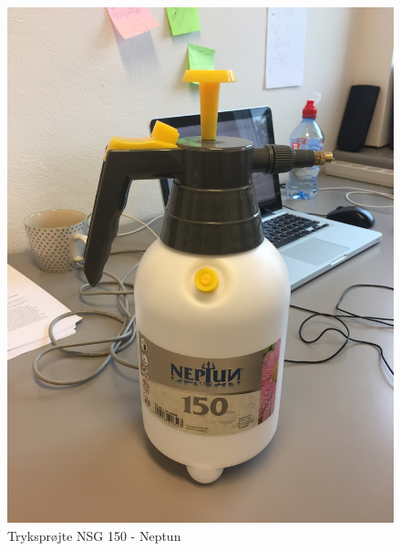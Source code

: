 \begin{figure}[htbp]
  \begin{minipage}[b]{0.5\linewidth}
    \centering
    \includegraphics[width=\linewidth]{tryk.jpg}
    \caption{Tryksprøjte NSG 150 - Neptun}
    \label{fig:tryks}
  \end{minipage}
  \hspace{0.5cm}
  \begin{minipage}[b]{0.5\linewidth}
    \centering

\end{minipage}
\end{figure}
